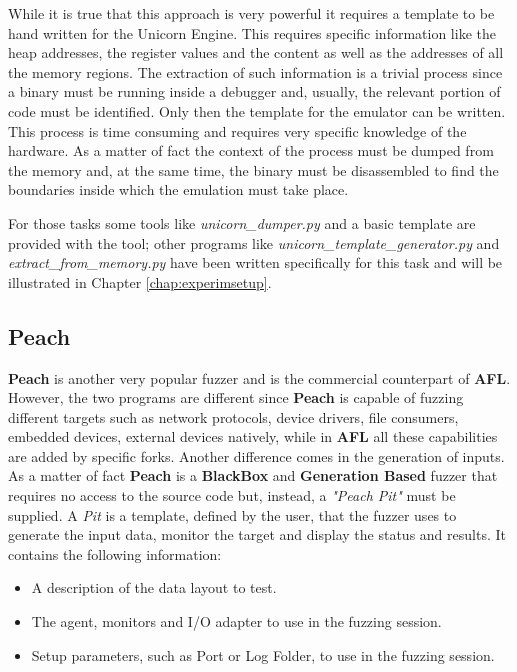 \documentclass[../main.tex]{subfiles}
\begin{document}
While it is true that this approach is very powerful it requires a template  to be hand written for the Unicorn Engine. This requires specific information like the heap addresses, the register values and the content as well as the addresses of all the memory regions. The extraction of such information is a trivial process since a binary must be running inside a debugger and, usually, the relevant portion of code must be identified. Only then the template for the emulator can be written. This process is time consuming and requires very specific knowledge of the hardware. As a matter of fact the context of the process must be dumped from the memory and, at the same time, the binary must be disassembled to find the boundaries inside which the emulation must take place.

For those tasks some tools like \textit{unicorn\_dumper.py} and a basic template are provided with the tool; other programs like \textit{unicorn\_template\_generator.py} and \textit{extract\_from\_memory.py} have been written specifically for this task and will be illustrated in Chapter \ref{chap:experimsetup}.

\subsection{Peach}

\textbf{Peach} is another very popular fuzzer and is the commercial counterpart of \textbf{AFL}. However, the two programs are different since \textbf{Peach} is capable of fuzzing different targets such as network protocols, device drivers, file consumers, embedded devices, external devices natively, while in \textbf{AFL} all these capabilities are added by specific forks. Another difference comes in the generation of inputs. As a matter of fact \textbf{Peach} is a \textbf{BlackBox} and \textbf{Generation Based} fuzzer that requires no access to the source code but, instead, a \textit{"Peach Pit"} must be supplied. A \textit{Pit} is a template, defined by the user, that the fuzzer uses to generate the input data, monitor the target and display the status and results. It contains the following information:

\begin{itemize}
  \item A description of the data layout to test.
  \item The agent, monitors and I/O adapter to use in the fuzzing session.
  \item Setup parameters, such as Port or Log Folder, to use in the fuzzing session.
\end{itemize}
\end{document}
